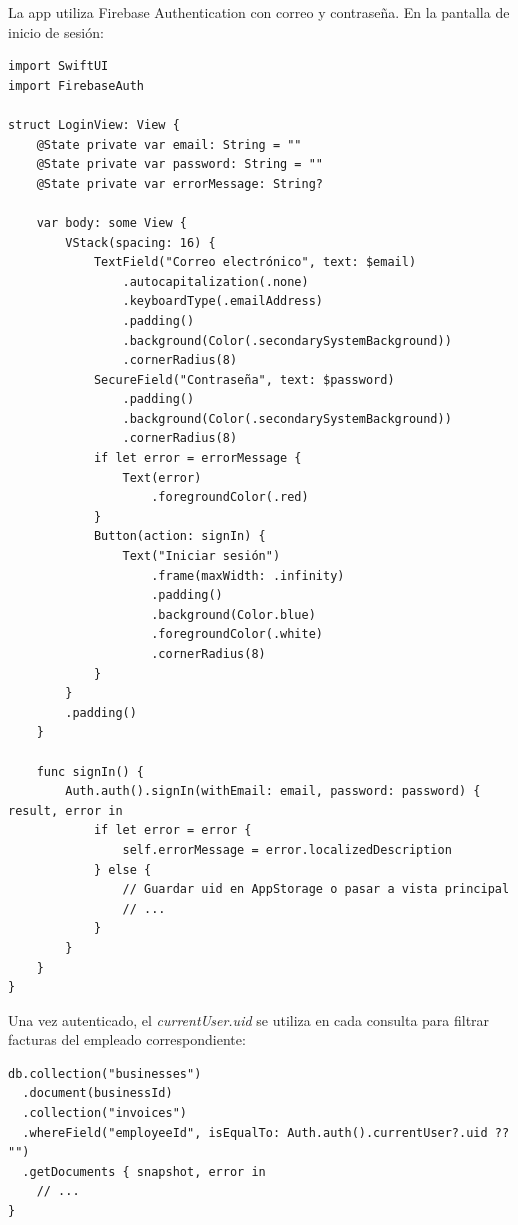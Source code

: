 \begin{large}

La app utiliza Firebase Authentication con correo y contraseña. En la pantalla de inicio de sesión:

\begin{verbatim}
import SwiftUI
import FirebaseAuth

struct LoginView: View {
    @State private var email: String = ""
    @State private var password: String = ""
    @State private var errorMessage: String?

    var body: some View {
        VStack(spacing: 16) {
            TextField("Correo electrónico", text: $email)
                .autocapitalization(.none)
                .keyboardType(.emailAddress)
                .padding()
                .background(Color(.secondarySystemBackground))
                .cornerRadius(8)
            SecureField("Contraseña", text: $password)
                .padding()
                .background(Color(.secondarySystemBackground))
                .cornerRadius(8)
            if let error = errorMessage {
                Text(error)
                    .foregroundColor(.red)
            }
            Button(action: signIn) {
                Text("Iniciar sesión")
                    .frame(maxWidth: .infinity)
                    .padding()
                    .background(Color.blue)
                    .foregroundColor(.white)
                    .cornerRadius(8)
            }
        }
        .padding()
    }

    func signIn() {
        Auth.auth().signIn(withEmail: email, password: password) { result, error in
            if let error = error {
                self.errorMessage = error.localizedDescription
            } else {
                // Guardar uid en AppStorage o pasar a vista principal
                // ...
            }
        }
    }
}
\end{verbatim}

Una vez autenticado, el \textit{currentUser.uid} se utiliza en cada consulta para filtrar facturas del empleado correspondiente:

\begin{verbatim}
db.collection("businesses")
  .document(businessId)
  .collection("invoices")
  .whereField("employeeId", isEqualTo: Auth.auth().currentUser?.uid ?? "")
  .getDocuments { snapshot, error in
    // ...
}
\end{verbatim}

\end{large}

